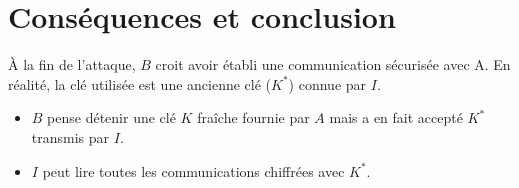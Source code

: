 \documentclass[11pt]{article}
\begin{document}
\section{Conséquences et conclusion}

\noindent
À la fin de l'attaque, $B$ croit avoir établi une communication sécurisée avec A. En réalité, la clé
utilisée est une ancienne clé ($K^*$) connue par $I$.

\begin{itemize}
    \item $B$ pense détenir une clé $K$ fraîche fournie par $A$ mais a en fait accepté $K^*$ transmis par $I$.
    \item $I$ peut lire toutes les communications chiffrées avec $K^*$.
\end{itemize}
\end{document}
